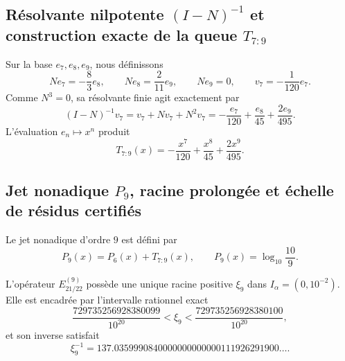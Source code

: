 \subsection{Résolvante nilpotente \texorpdfstring{\((I-N)^{-1}\)}{(I-N)^-1} et construction exacte de la queue \texorpdfstring{\(T_{7:9}\)}{T7:9}}
\label{sec:l9s102:alpha-resolvente}

Sur la base \(e_7,e_8,e_9\), nous définissons
\begin{equation}
 Ne_7=-\frac83e_8,
 \qquad
 Ne_8=\frac2{11}e_9,
 \qquad
 Ne_9=0,
 \qquad
 v_7=-\frac1{120}e_7.
 \label{eq:l9s102:alpha-nilpotente}
\end{equation}
Comme \(N^3=0\), sa résolvante finie agit exactement par
\begin{equation}
 (I-N)^{-1}v_7
 =v_7+Nv_7+N^2v_7
 =-\frac{e_7}{120}+\frac{e_8}{45}+\frac{2e_9}{495}.
 \label{eq:l9s102:alpha-resolvente-finito}
\end{equation}
L'évaluation \(e_n\mapsto x^n\) produit
\begin{equation}
 \boxed{
 T_{7:9}(x)=-\frac{x^7}{120}+\frac{x^8}{45}
 +\frac{2x^9}{495}.}
 \label{eq:l9s102:alpha-t79}
\end{equation}

\subsection{Jet nonadique \texorpdfstring{\(P_9\)}{P9}, racine prolongée et échelle de résidus certifiés}
\label{sec:l9s102:alpha-jet-p9}

Le jet nonadique d'ordre \(9\) est défini par
\begin{equation}
 P_9(x)=P_6(x)+T_{7:9}(x),
 \qquad
 P_9(x)=\log_{10}\frac{10}{9}.
 \label{eq:l9s102:alpha-p9}
\end{equation}
\begin{theorem}
\label{thm:l9s102:raiz-p9-unica}
L'opérateur \(E_{21/22}^{(9)}\) possède une unique racine positive \(\xi_9\) dans
\(I_\alpha=(0,10^{-2})\). Elle est encadrée par l'intervalle rationnel exact
\begin{equation}
 \frac{729735256928380099}{10^{20}}
 <\xi_9<
 \frac{729735256928380100}{10^{20}},
 \label{eq:l9s102:encierro-raiz-p9}
\end{equation}
et son inverse satisfait
\begin{equation}
 \xi_9^{-1}
 =137.0359990840000000000000111926291900\ldots .
 \label{eq:l9s102:alpha-raíz-p9}
\end{equation}
\end{theorem}

